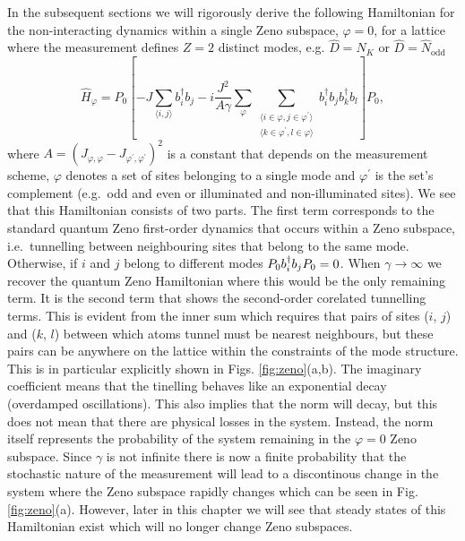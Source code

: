 In the subsequent sections we will rigorously derive the following
Hamiltonian for the non-interacting dynamics within a single Zeno
subspace, $\varphi = 0$, for a lattice where the measurement defines
$Z = 2$ distinct modes, e.g. $\hat{D} = \hat{N}_K$ or
$\hat{D} = \hat{N}_\mathrm{odd}$
\begin{equation}
  \label{eq:hz}
  \hat{H}_\varphi = P_0 \left[ -J \sum_{\langle i, j \rangle}
    b^\dagger_i b_j - i \frac{J^2} {A \gamma} \sum_{\varphi} 
    \sum_{\substack{\langle i \in \varphi, j \in \varphi^\prime
        \rangle \\ \langle k \in \varphi^\prime, l \in \varphi
        \rangle}} b^\dagger_i b_j b^\dagger_k b_l \right] P_0,
\end{equation}
where
$A = (J_{\varphi,\varphi} - J_{\varphi^\prime,\varphi^\prime})^2$ is a
constant that depends on the measurement scheme, $\varphi$ denotes a
set of sites belonging to a single mode and $\varphi^\prime$ is the
set's complement (e.g.~odd and even or illuminated and non-illuminated
sites). We see that this Hamiltonian consists of two parts. The first
term corresponds to the standard quantum Zeno first-order dynamics
that occurs within a Zeno subspace, i.e.~tunnelling between
neighbouring sites that belong to the same mode. Otherwise, if $i$ and
$j$ belong to different modes $P_0 b^\dagger_i b_j P_0 = 0$. When
$\gamma \rightarrow \infty$ we recover the quantum Zeno Hamiltonian
where this would be the only remaining term. It is the second term
that shows the second-order corelated tunnelling terms. This is
evident from the inner sum which requires that pairs of sites ($i$,
$j$) and ($k$, $l$) between which atoms tunnel must be nearest
neighbours, but these pairs can be anywhere on the lattice within the
constraints of the mode structure. This is in particular explicitly
shown in Figs. \ref{fig:zeno}(a,b). The imaginary coefficient means
that the tinelling behaves like an exponential decay (overdamped
oscillations). This also implies that the norm will decay, but this
does not mean that there are physical losses in the system. Instead,
the norm itself represents the probability of the system remaining in
the $\varphi = 0$ Zeno subspace. Since $\gamma$ is not infinite there
is now a finite probability that the stochastic nature of the
measurement will lead to a discontinous change in the system where the
Zeno subspace rapidly changes which can be seen in
Fig. \ref{fig:zeno}(a). However, later in this chapter we will see
that steady states of this Hamiltonian exist which will no longer
change Zeno subspaces.

